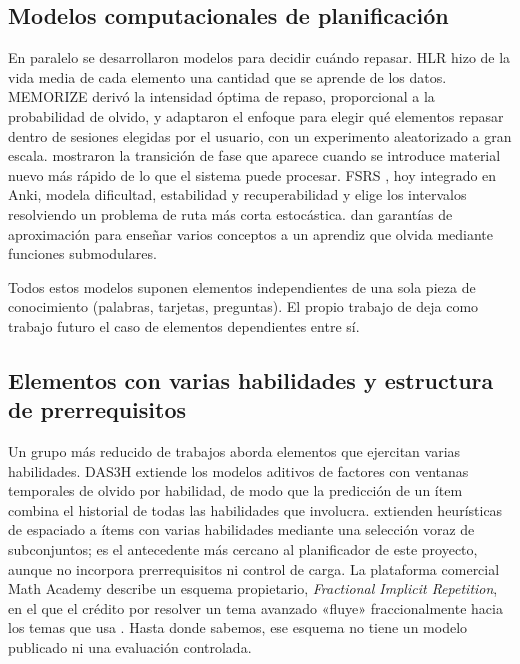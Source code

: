 \documentclass[12pt]{article}
\theoremstyle{definition}
\begin{document}
\subsection{Modelos computacionales de planificación}

En paralelo se desarrollaron modelos para decidir cuándo repasar. HLR \citep{settles2016} hizo de la vida media de cada elemento una cantidad que se aprende de los datos. MEMORIZE \citep{tabibian2019} derivó la intensidad óptima de repaso, proporcional a la probabilidad de olvido, y \citet{upadhyay2021} adaptaron el enfoque para elegir qué elementos repasar dentro de sesiones elegidas por el usuario, con un experimento aleatorizado a gran escala. \citet{reddy2016} mostraron la transición de fase que aparece cuando se introduce material nuevo más rápido de lo que el sistema puede procesar. FSRS \citep{ye2022,su2023}, hoy integrado en Anki, modela dificultad, estabilidad y recuperabilidad y elige los intervalos resolviendo un problema de ruta más corta estocástica. \citet{hunziker2019} dan garantías de aproximación para enseñar varios conceptos a un aprendiz que olvida mediante funciones submodulares.

Todos estos modelos suponen elementos independientes de una sola pieza de conocimiento (palabras, tarjetas, preguntas). El propio trabajo de \citet{tabibian2019} deja como trabajo futuro el caso de elementos dependientes entre sí.

\subsection{Elementos con varias habilidades y estructura de prerrequisitos}

Un grupo más reducido de trabajos aborda elementos que ejercitan varias habilidades. DAS3H \citep{choffin2019} extiende los modelos aditivos de factores con ventanas temporales de olvido por habilidad, de modo que la predicción de un ítem combina el historial de todas las habilidades que involucra. \citet{choffin2021} extienden heurísticas de espaciado a ítems con varias habilidades mediante una selección voraz de subconjuntos; es el antecedente más cercano al planificador de este proyecto, aunque no incorpora prerrequisitos ni control de carga. La plataforma comercial Math Academy describe un esquema propietario, \emph{Fractional Implicit Repetition}, en el que el crédito por resolver un tema avanzado «fluye» fraccionalmente hacia los temas que usa \citep{skycak2023}. Hasta donde sabemos, ese esquema no tiene un modelo publicado ni una evaluación controlada.
\end{document}

